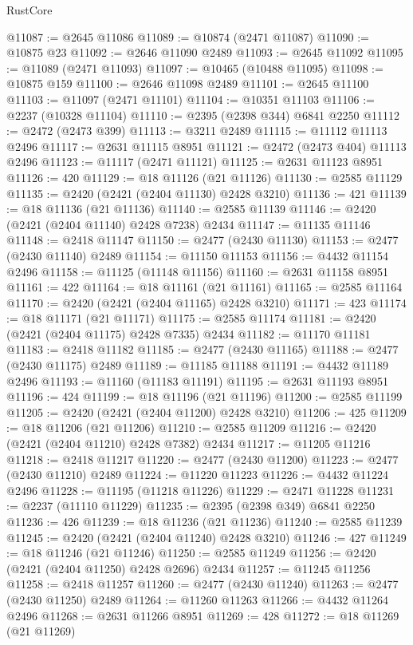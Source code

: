 \begin{lexlean}{RustCore}
\begin{coremodule}
@11087 := @2645 @11086
@11089 := @10874 (@2471 @11087)
@11090 := @10875 @23
@11092 := @2646 @11090 @2489
@11093 := @2645 @11092
@11095 := @11089 (@2471 @11093)
@11097 := @10465 (@10488 @11095)
@11098 := @10875 @159
@11100 := @2646 @11098 @2489
@11101 := @2645 @11100
@11103 := @11097 (@2471 @11101)
@11104 := @10351 @11103
@11106 := @2237 (@10328 @11104)
@11110 := @2395 (@2398 @344) @6841 @2250
@11112 := @2472 (@2473 @399)
@11113 := @3211 @2489
@11115 := @11112 @11113 @2496
@11117 := @2631 @11115 @8951
@11121 := @2472 (@2473 @404) @11113 @2496
@11123 := @11117 (@2471 @11121)
@11125 := @2631 @11123 @8951
@11126 := 420
@11129 := @18 @11126 (@21 @11126)
@11130 := @2585 @11129
@11135 := @2420 (@2421 (@2404 @11130) @2428 @3210)
@11136 := 421
@11139 := @18 @11136 (@21 @11136)
@11140 := @2585 @11139
@11146 := @2420 (@2421 (@2404 @11140) @2428 @7238) @2434
@11147 := @11135 @11146
@11148 := @2418 @11147
@11150 := @2477 (@2430 @11130)
@11153 := @2477 (@2430 @11140) @2489
@11154 := @11150 @11153
@11156 := @4432 @11154 @2496
@11158 := @11125 (@11148 @11156)
@11160 := @2631 @11158 @8951
@11161 := 422
@11164 := @18 @11161 (@21 @11161)
@11165 := @2585 @11164
@11170 := @2420 (@2421 (@2404 @11165) @2428 @3210)
@11171 := 423
@11174 := @18 @11171 (@21 @11171)
@11175 := @2585 @11174
@11181 := @2420 (@2421 (@2404 @11175) @2428 @7335) @2434
@11182 := @11170 @11181
@11183 := @2418 @11182
@11185 := @2477 (@2430 @11165)
@11188 := @2477 (@2430 @11175) @2489
@11189 := @11185 @11188
@11191 := @4432 @11189 @2496
@11193 := @11160 (@11183 @11191)
@11195 := @2631 @11193 @8951
@11196 := 424
@11199 := @18 @11196 (@21 @11196)
@11200 := @2585 @11199
@11205 := @2420 (@2421 (@2404 @11200) @2428 @3210)
@11206 := 425
@11209 := @18 @11206 (@21 @11206)
@11210 := @2585 @11209
@11216 := @2420 (@2421 (@2404 @11210) @2428 @7382) @2434
@11217 := @11205 @11216
@11218 := @2418 @11217
@11220 := @2477 (@2430 @11200)
@11223 := @2477 (@2430 @11210) @2489
@11224 := @11220 @11223
@11226 := @4432 @11224 @2496
@11228 := @11195 (@11218 @11226)
@11229 := @2471 @11228
@11231 := @2237 (@11110 @11229)
@11235 := @2395 (@2398 @349) @6841 @2250
@11236 := 426
@11239 := @18 @11236 (@21 @11236)
@11240 := @2585 @11239
@11245 := @2420 (@2421 (@2404 @11240) @2428 @3210)
@11246 := 427
@11249 := @18 @11246 (@21 @11246)
@11250 := @2585 @11249
@11256 := @2420 (@2421 (@2404 @11250) @2428 @2696) @2434
@11257 := @11245 @11256
@11258 := @2418 @11257
@11260 := @2477 (@2430 @11240)
@11263 := @2477 (@2430 @11250) @2489
@11264 := @11260 @11263
@11266 := @4432 @11264 @2496
@11268 := @2631 @11266 @8951
@11269 := 428
@11272 := @18 @11269 (@21 @11269)

\end{coremodule}
\end{lexlean}
